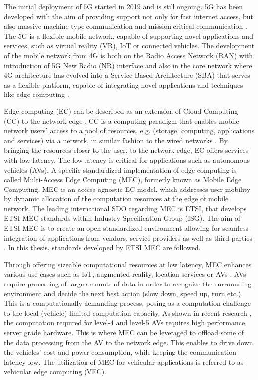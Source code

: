 \documentclass[12pt,a4paper,twoside]{report}
\begin{document}
The initial deployment of 5G started in 2019 and is still ongoing. 5G has been developed with the aim of providing support not only for fast internet access, but also massive machine-type communication and mission critical communication \cite{dahlman-2020-5g}. The 5G is a flexible mobile network, capable of supporting novel applications and services, such as virtual reality (VR), IoT or connected vehicles. The development of the mobile network from 4G is both on the Radio Access Network (RAN) with introduction of 5G New Radio (NR) interface and also in the core network where 4G architecture has evolved into a Service Based Architecture (SBA) that serves as a flexible platform, capable of integrating novel applications and techniques like edge computing \cite{sabella-mec-sw-dev}.

Edge computing (EC) can be described as an extension of Cloud Computing (CC) to the network edge \cite{sabella-mec-sw-dev}. CC is a computing paradigm that enables mobile network users’ access to a pool of resources, e.g. (storage, computing, applications and services) via a network, in similar fashion to the wired networks \cite{mell2011nistCC}. By bringing the resources closer to the user, to the network edge, EC offers services with low latency. The low latency is critical for applications such as autonomous vehicles (AVs). A specific standardized implementation of edge computing is called Multi-Access Edge Computing (MEC), formerly known as Mobile Edge Computing. MEC is an access agnostic EC model, which addresses user mobility by dynamic allocation of the computation resources at the edge of mobile network. The leading international SDO regarding MEC is ETSI, that develops ETSI MEC standards within Industry Specification Group (ISG). The aim of ETSI MEC is to create an open standardized environment allowing for seamless integration of applications from vendors, service providers as well as third parties \cite{etsi-web}.  In this thesis, standards developed by ETSI MEC are followed.

Through offering sizeable computational resources at low latency, MEC enhances various use cases such as IoT, augmented reality, location services or AVs \cite{etsi-web}. AVs require processing of large amounts of data in order to recognize the surrounding environment and decide the next best action (slow down, speed up, turn etc.). This is a computationally demanding process, posing as a computation challenge to the local (vehicle) limited computation capacity. As shown in recent research \cite{zhao2019towards}, the computation required for level-4 and level-5 AVs requires high performance server grade hardware. This is where MEC can be leveraged to offload some of the data processing from the AV to the network edge. This enables to drive down the vehicles’ cost and power consumption, while keeping the communication latency low. The utilization of MEC for vehicular applications is referred to as vehicular edge computing (VEC).
\end{document}

